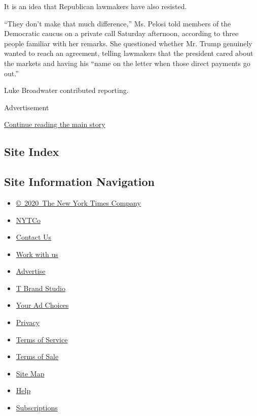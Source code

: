 It is an idea that Republican lawmakers have also resisted.

``They don't make that much difference,'' Ms. Pelosi told members of the
Democratic caucus on a private call Saturday afternoon, according to
three people familiar with her remarks. She questioned whether Mr. Trump
genuinely wanted to reach an agreement, telling lawmakers that the
president cared about the markets and having his ``name on the letter
when those direct payments go out.''

Luke Broadwater contributed reporting.

Advertisement

\protect\hyperlink{after-bottom}{Continue reading the main story}

\hypertarget{site-index}{%
\subsection{Site Index}\label{site-index}}

\hypertarget{site-information-navigation}{%
\subsection{Site Information
Navigation}\label{site-information-navigation}}

\begin{itemize}
\tightlist
\item
  \href{https://help.nytimes3xbfgragh.onion/hc/en-us/articles/115014792127-Copyright-notice}{©~2020~The
  New York Times Company}
\end{itemize}

\begin{itemize}
\tightlist
\item
  \href{https://www.nytco.com/}{NYTCo}
\item
  \href{https://help.nytimes3xbfgragh.onion/hc/en-us/articles/115015385887-Contact-Us}{Contact
  Us}
\item
  \href{https://www.nytco.com/careers/}{Work with us}
\item
  \href{https://nytmediakit.com/}{Advertise}
\item
  \href{http://www.tbrandstudio.com/}{T Brand Studio}
\item
  \href{https://www.nytimes3xbfgragh.onion/privacy/cookie-policy\#how-do-i-manage-trackers}{Your
  Ad Choices}
\item
  \href{https://www.nytimes3xbfgragh.onion/privacy}{Privacy}
\item
  \href{https://help.nytimes3xbfgragh.onion/hc/en-us/articles/115014893428-Terms-of-service}{Terms
  of Service}
\item
  \href{https://help.nytimes3xbfgragh.onion/hc/en-us/articles/115014893968-Terms-of-sale}{Terms
  of Sale}
\item
  \href{https://spiderbites.nytimes3xbfgragh.onion}{Site Map}
\item
  \href{https://help.nytimes3xbfgragh.onion/hc/en-us}{Help}
\item
  \href{https://www.nytimes3xbfgragh.onion/subscription?campaignId=37WXW}{Subscriptions}
\end{itemize}
